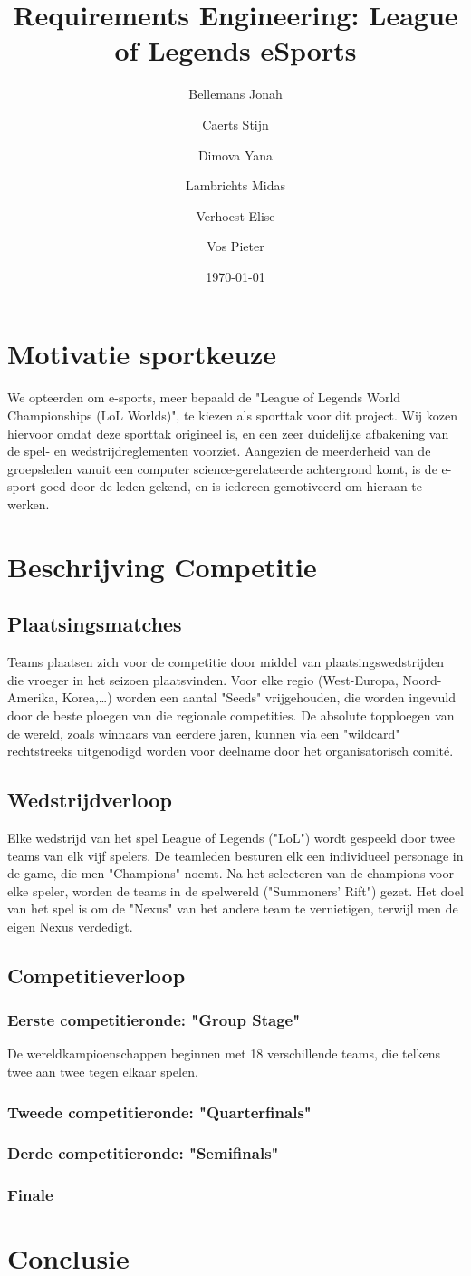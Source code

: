\documentclass[12pt,a4paper]{article}
\title{Requirements Engineering: League of Legends eSports}
\author{Bellemans Jonah \and Caerts Stijn \and Dimova Yana \and Lambrichts Midas \and Verhoest Elise \and Vos Pieter}
\date{\today}
\begin{document}
	\maketitle
	\newpage
	\tableofcontents
	\newpage
	\section{Motivatie sportkeuze}
		We opteerden om e-sports, meer bepaald de "League of Legends World Championships (LoL Worlds)", te kiezen als sporttak voor dit project. Wij kozen hiervoor omdat deze sporttak origineel is, en een zeer duidelijke afbakening van de spel- en wedstrijdreglementen voorziet. Aangezien de meerderheid van de groepsleden vanuit een computer science-gerelateerde achtergrond komt, is de e-sport goed door de leden gekend, en is iedereen gemotiveerd om hieraan te werken.
	\section{Beschrijving Competitie}
		\subsection{Plaatsingsmatches}
			Teams plaatsen zich voor de competitie door middel van plaatsingswedstrijden die vroeger in het seizoen plaatsvinden. Voor elke regio (West-Europa, Noord-Amerika, Korea,\dots) worden een aantal "Seeds" vrijgehouden, die worden ingevuld door de beste ploegen van die regionale competities. De absolute topploegen van de wereld, zoals winnaars van eerdere jaren, kunnen via een "wildcard" rechtstreeks uitgenodigd worden voor deelname door het organisatorisch comité.
		\subsection{Wedstrijdverloop}
			Elke wedstrijd van het spel League of Legends ("LoL") wordt gespeeld door twee teams van elk vijf spelers. De teamleden besturen elk een individueel personage in de game, die men "Champions" noemt. Na het selecteren van de champions voor elke speler, worden de teams in de spelwereld ("Summoners' Rift") gezet. Het doel van het spel is om de "Nexus" van het andere team te vernietigen, terwijl men de eigen Nexus verdedigt.
		\subsection{Competitieverloop}
			\subsubsection{Eerste competitieronde: "Group Stage"}
				De wereldkampioenschappen beginnen met 18 verschillende teams, die telkens twee aan twee tegen elkaar spelen. 
			\subsubsection{Tweede competitieronde: "Quarterfinals"}
			\subsubsection{Derde competitieronde: "Semifinals"}
			\subsubsection{Finale}
	\section{Conclusie}
\end{document}
